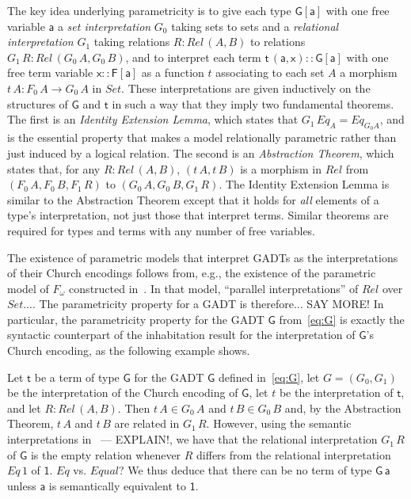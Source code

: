 \documentclass[acmsmall,screen,review,anonymous]{acmart}
\theoremstyle{definition}
\begin{document}
The key idea underlying parametricity is to give each type
$\mathsf{G[a]}$ with one free variable $\mathsf{a}$ a {\em set
  interpretation} $G_0$ taking sets to sets and a \emph{relational
  interpretation} $G_1$ taking relations $R : \mathit{Rel}\,(A,B)$ to
relations $G_1 \,R : \mathit{Rel}\,(G_0 \,A, G_0 \,B)$, and to
interpret each term $\mathsf{t\,(a,x) :: G[a]}$ with one free term
variable $\mathsf{x :: F[a]}$ as a function $t$ associating to each
set $A$ a morphism $t \,A : F_0\,A \to G_0\,A$ in $\mathit{Set}$.
These interpretations are given inductively on the structures of
$\mathsf{G}$ and $\mathsf{t}$ in such a way that they imply two
fundamental theorems. The first is an \emph{Identity Extension Lemma},
which states that $G_1\,\mathit{Eq}_A = \mathit{Eq}_{G_0 A}$, and is
the essential property that makes a model relationally parametric
rather than just induced by a logical relation.  The second is an
\emph{Abstraction Theorem}, which states that, for any $R
:\mathit{Rel}\,(A, B)$, $(t\, A, t\,B)$ is a morphism in
$\mathit{Rel}$ from $(F_0\,A,F_0\,B,F_1\,R)$ to
$(G_0\,A,G_0\,B,G_1\,R)$. The Identity Extension Lemma is similar to
the Abstraction Theorem except that it holds for {\em all} elements of
a type's interpretation, not just those that interpret terms.  Similar
theorems are required for types and terms with any number of free
variables.

The existence of parametric models that interpret GADTs as the
interpretations of their Church encodings follows from, e.g., the
existence of the parametric model of $F_\omega$ constructed
in~\cite{atk12}.  In that model, {\color{blue} ``parallel
  interpretations'' of $Rel$ over $Set$...}.  The parametricity
property for a GADT is therefore...  {\color{blue} SAY MORE!} In
particular, the parametricity property for the GADT $\mathsf{G}$
from~\eqref{eq:G} is exactly the syntactic counterpart of the
inhabitation result for the interpretation of $\mathsf{G}$'s Church
encoding, as the following example shows.

\begin{example}
Let $\mathsf{t}$ be a term of type $\mathsf{G}$ for the GADT
$\mathsf{G}$ defined in~\eqref{eq:G}, let $G = (G_0,G_1)$ be the
interpretation of the Church encoding of $\mathsf{G}$, let $t$ be the
interpretation of $\mathsf{t}$, and let $R :
\mathit{Rel}\,(A,B)$. Then $t\, A \in G_0\,A$ and $t\,B \in G_0\,B$
and, by the Abstraction Theorem, $t\,A$ and $t\,B$ are related in
$G_1\,R$. However, {\color{blue} using the semantic interpretations
  in~\cite{atk12} --- EXPLAIN!}, we have that the relational
interpretation $G_1\,R$ of $\mathsf{G}$ is the empty relation whenever
$R$ differs from the relational interpretation $\mathit{Eq}\,1$ of
$\mathsf{1}$.  {\color{blue} $Eq$ vs. $Equal$?}  We thus deduce that
there can be no term of type $\mathsf{G\,a}$ unless $\mathsf{a}$ is
semantically equivalent to $\mathsf{1}$.
\end{example}
\end{document}
